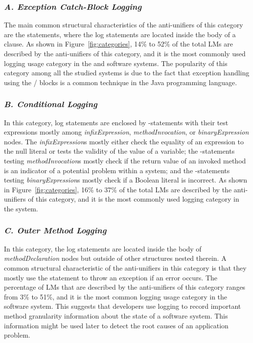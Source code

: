 \subsubsection{\emph{A. Exception Catch-Block Logging}}  \label{Exception catch-block logging}
The main common structural characteristics of the anti-unifiers of this category are the  statements, where the log statements are located inside the body of a  clause. As shown in Figure~\ref{fig:categories}, 14\% to 52\% of the total LMs are described by the anti-unifiers of this category, and it is the most commonly used logging usage category in the  and  software systems. The popularity of this category among all the studied systems is due to the fact that exception handling using the / blocks is a common technique in the Java programming language.


\subsubsection{\emph{B. Conditional Logging}}  \label{conditional logging}
In this category, log statements are enclosed by -statements with their test expressions mostly among \textit{infixExpression}, \textit{methodInvocation}, or \textit{binaryExpression} nodes. The \textit{infixExpression}s mostly either check the equality of an expression to the null literal or tests the validity of the value of a variable; the -statements testing \textit{methodInvocation}s mostly check if the return value of an invoked method is an indicator of a potential problem within a system; and the -statements testing \textit{binaryExpression}s mostly check if a Boolean literal is incorrect. As shown in Figure~\ref{fig:categories}, 16\% to 37\% of the total LMs are described by the anti-unifiers of this category, and it is the most commonly used logging category in the  system.

\subsubsection{\emph{C. Outer Method Logging}}  \label{method logging}
In this category, the log statements are located inside the body of \textit{methodDeclaration} nodes but outside of other structures nested therein. A common structural characteristic of the anti-unifiers in this category is that they mostly use the  statement to throw an exception if an error occurs. The percentage of LMs that are described by the anti-unifiers of this category ranges from 3\% to 51\%, and it is the most common logging usage category in the  software system. This suggests that developers use logging to record important method granularity information about the state of a software system. This information might be used later to detect the root causes of an application problem.



